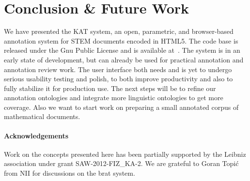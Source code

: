 \documentclass{llncs}
\def\KAT{\textsf{KAT}\xspace}
\begin{document}
\section{Conclusion \& Future Work}\label{sec:concl}

We have presented the \KAT system, an open, parametric, and browser-based annotation
system for STEM documents encoded in HTML5.  The code base is released under the Gnu Public
License and is available at~\cite{KAT:github:on}. The system is in an early state of
development, but can already be used for practical annotation and annotation review work.
The user interface both needs and is yet to undergo serious usability testing and polish,
to both improve productivity and also to fully stabilize it for production use.
The next steps will be to refine our annotation ontologies and integrate more linguistic
ontologies to get more coverage. Also we want to start work on preparing a 
small annotated corpus of mathematical documents. 

\paragraph{Acknowledgements} Work on the concepts presented here has been partially
supported by the Leibniz association under grant SAW-2012-FIZ\_KA-2. We are grateful to
Goran Topi\'c from NII for discussions on the brat system.

\printbibliography
\end{document}
